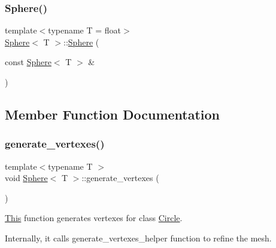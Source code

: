 \mbox{\label{classSphere_ae28ad7649c59d653b9e14a3042d186a1}} 
\subsubsection{\texorpdfstring{Sphere()}{Sphere()}\hspace{0.1cm}{\footnotesize\ttfamily [4/4]}}
{\footnotesize\ttfamily template$<$typename T = float$>$ \\
\mbox{\hyperlink{classSphere}{Sphere}}$<$ T $>$\+::\mbox{\hyperlink{classSphere}{Sphere}} (\begin{DoxyParamCaption}\item[{const \mbox{\hyperlink{classSphere}{Sphere}}$<$ T $>$ \&}]{ }\end{DoxyParamCaption})\hspace{0.3cm}{\ttfamily [default]}}



\subsection{Member Function Documentation}
\mbox{\label{classSphere_a9cfac85b9803fadc4b79db0ea047f679}} 
\subsubsection{\texorpdfstring{generate\+\_\+vertexes()}{generate\_vertexes()}}
{\footnotesize\ttfamily template$<$typename T $>$ \\
void \mbox{\hyperlink{classSphere}{Sphere}}$<$ T $>$\+::generate\+\_\+vertexes (\begin{DoxyParamCaption}{ }\end{DoxyParamCaption})\hspace{0.3cm}{\ttfamily [private]}}



\mbox{\hyperlink{classThis}{This}} function generates vertexes for class \mbox{\hyperlink{classCircle}{Circle}}. 

Internally, it calls generate\+\_\+vertexes\+\_\+helper function to refine the mesh. \mbox{\label{classSphere_a84a45f41ca9e630beb97fc106b359ffd}} 
